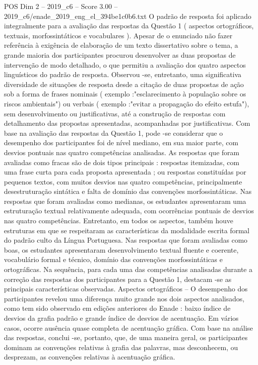 \begin{textsample}{POS Dim 2 – 2019\_c6 – Score 3.00 – 2019\_c6/enade\_2019\_eng\_el\_394be1c0b6.txt}
O padrão de resposta foi aplicado integralmente para a avaliação das respostas da Questão 1 ( aspectos ortográficos, textuais, morfossintáticos e vocabulares ).
Apesar de o enunciado não fazer referência à exigência de elaboração de um texto dissertativo sobre o tema, a grande maioria dos participantes procurou desenvolver as duas propostas de intervenção de modo detalhado, o que permitiu a avaliação dos quatro aspectos linguísticos do padrão de resposta.
Observou -se, entretanto, uma significativa diversidade de situações de resposta desde a citação de duas propostas de ação sob a forma de frases nominais ( exemplo :"esclarecimento à população sobre os riscos ambientais") ou verbais ( exemplo :"evitar a propagação do efeito estufa"), sem desenvolvimento ou justificativas, até a construção de respostas com detalhamento das propostas apresentadas, acompanhadas por justificativas.
Com base na avaliação das respostas da Questão 1, pode -se considerar que o desempenho dos participantes foi de nível mediano, em sua maior parte, com desvios pontuais nas quatro competências analisadas.
As respostas que foram avaliadas como fracas são de dois tipos principais : respostas itemizadas, com uma frase curta para cada proposta apresentada ; ou respostas constituídas por pequenos textos, com muitos desvios nas quatro competências, principalmente desestruturação sintática e falta de domínio das convenções morfossintáticas.
Nas respostas que foram avaliadas como medianas, os estudantes apresentaram uma estruturação textual relativamente adequada, com ocorrências pontuais de desvios nas quatro competências.
Entretanto, em todos os aspectos, também houve estruturas em que se respeitaram as características da modalidade escrita formal do padrão culto da Língua Portuguesa.
Nas respostas que foram avaliadas como boas, os estudantes apresentaram desenvolvimento textual fluente e coerente, vocabulário formal e técnico, domínio das convenções morfossintáticas e ortográficas.
Na sequência, para cada uma das competências analisadas durante a correção das respostas dos participantes para a Questão 1, destacam -se as principais características observadas.
Aspectos ortográficos – O desempenho dos participantes revelou uma diferença muito grande nos dois aspectos analisados, como tem sido observado em edições anteriores do Enade : baixo índice de desvios da grafia padrão e grande índice de desvios de acentuação.
Em vários casos, ocorre ausência quase completa de acentuação gráfica.
Com base na análise das respostas, conclui -se, portanto, que, de uma maneira geral, os participantes dominam as convenções relativas à grafia das palavras, mas desconhecem, ou desprezam, as convenções relativas à acentuação gráfica.

\end{textsample}
